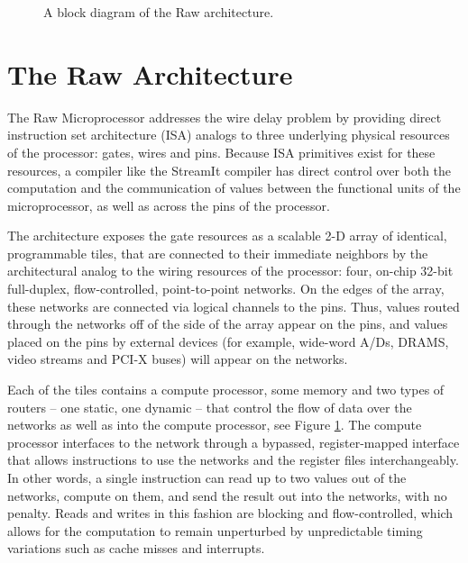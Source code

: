 \begin{figure}
\centering
{}
\caption{A block diagram of the Raw architecture.
\protect\label{fig:raw-diagram}}
\end{figure}

\section{The Raw Architecture}
\label{sec:raw}

The Raw Microprocessor \cite{raw9}\cite{raw10} addresses the wire
delay \cite{raw13} problem by providing direct instruction set
architecture (ISA) analogs to three underlying physical resources of
the processor: gates, wires and pins. Because ISA primitives exist for
these resources, a compiler like the StreamIt compiler has direct
control over both the computation and the communication of values
between the functional units of the microprocessor, as well as across
the pins of the processor.

The architecture exposes the gate resources as a scalable 2-D array of
identical, programmable tiles, that are connected to their immediate
neighbors by the architectural analog to the wiring resources of the
processor: four, on-chip 32-bit full-duplex, flow-controlled,
point-to-point networks.  On the edges of the array, these networks
are connected via logical channels \cite{raw11} to the pins.  Thus,
values routed through the networks off of the side of the array appear
on the pins, and values placed on the pins by external devices (for
example, wide-word A/Ds, DRAMS, video streams and PCI-X buses) will
appear on the networks.

Each of the tiles contains a compute processor, some memory and two
types of routers -- one static, one dynamic -- that control the flow
of data over the networks as well as into the compute processor, see
Figure \ref{fig:raw-diagram}. The compute processor interfaces to the
network through a bypassed, register-mapped interface \cite{raw10}
that allows instructions to use the networks and the register files
interchangeably. In other words, a single instruction can read up to
two values out of the networks, compute on them, and send the result
out into the networks, with no penalty.  Reads and writes in this
fashion are blocking and flow-controlled, which allows for the
computation to remain unperturbed by unpredictable timing variations
such as cache misses and interrupts.

